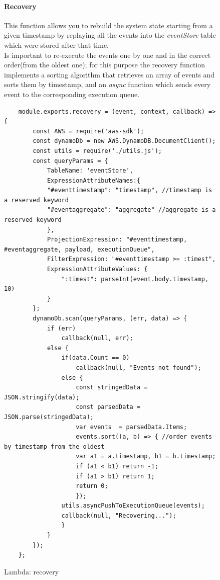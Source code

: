\begin{figure} [H]
\paragraph{Recovery} \MiniSpazio
This function allows you to rebuild the system state starting from a given timestamp by replaying all the events into the \emph{eventStore} table which were stored after that time. \\
Is important to re-execute the events one by one and in the correct order(from the oldest one); for this purpose the recovery function implements a sorting algorithm that retrieves an array of events and sorts them by timestamp, and an \emph{async} function which sends every event to the corresponding execution queue.
\begin{lstlisting}
	module.exports.recovery = (event, context, callback) => { 
		const AWS = require('aws-sdk');
		const dynamoDb = new AWS.DynamoDB.DocumentClient();
		const utils = require('./utils.js');
		const queryParams = { 
			TableName: 'eventStore',
			ExpressionAttributeNames:{
			"#eventtimestamp": "timestamp", //timestamp is a reserved keyword
			"#eventaggregate": "aggregate" //aggregate is a reserved keyword 
			},
			ProjectionExpression: "#eventtimestamp, #eventaggregate, payload, executionQueue",
			FilterExpression: "#eventtimestamp >= :timest",
			ExpressionAttributeValues: {
				":timest": parseInt(event.body.timestamp, 10)
			}
		};
		dynamoDb.scan(queryParams, (err, data) => {
			if (err)
				callback(null, err);
			else {
				if(data.Count == 0)
					callback(null, "Events not found");
				else {
					const stringedData = JSON.stringify(data);
					const parsedData = JSON.parse(stringedData);
					var events  = parsedData.Items;
					events.sort((a, b) => { //order events by timestamp from the oldest
					var a1 = a.timestamp, b1 = b.timestamp;
					if (a1 < b1) return -1;
					if (a1 > b1) return 1;
					return 0;
					});
				utils.asyncPushToExecutionQueue(events);
				callback(null, "Recovering...");
				}
			} 
		});
	};
\end{lstlisting}
	\caption{Lambda: recovery}
\end{figure}

